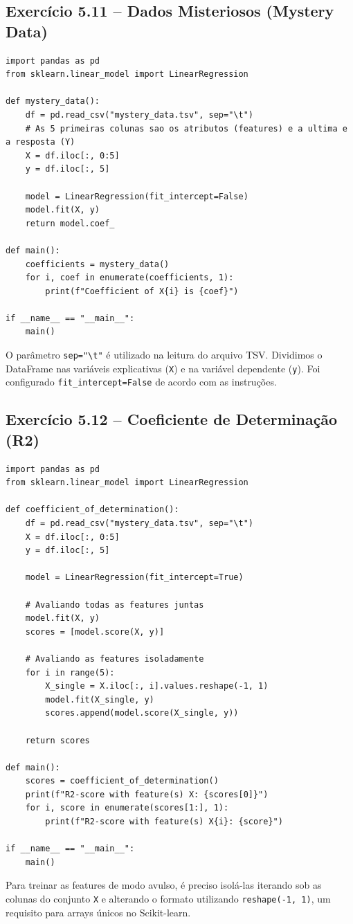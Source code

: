 \documentclass[11pt,a4paper]{article}
\begin{document}
\subsection*{Exercício 5.11 -- Dados Misteriosos (Mystery Data)}
\begin{solucao}
\begin{lstlisting}
import pandas as pd
from sklearn.linear_model import LinearRegression

def mystery_data():
    df = pd.read_csv("mystery_data.tsv", sep="\t")
    # As 5 primeiras colunas sao os atributos (features) e a ultima e a resposta (Y)
    X = df.iloc[:, 0:5]
    y = df.iloc[:, 5]
    
    model = LinearRegression(fit_intercept=False)
    model.fit(X, y)
    return model.coef_

def main():
    coefficients = mystery_data()
    for i, coef in enumerate(coefficients, 1):
        print(f"Coefficient of X{i} is {coef}")

if __name__ == "__main__":
    main()
\end{lstlisting}
O parâmetro \texttt{sep="\textbackslash t"} é utilizado na leitura do arquivo TSV. Dividimos o DataFrame nas variáveis explicativas (\texttt{X}) e na variável dependente (\texttt{y}). Foi configurado \texttt{fit\_intercept=False} de acordo com as instruções.
\end{solucao}

\subsection*{Exercício 5.12 -- Coeficiente de Determinação (R2)}
\begin{solucao}
\begin{lstlisting}
import pandas as pd
from sklearn.linear_model import LinearRegression

def coefficient_of_determination():
    df = pd.read_csv("mystery_data.tsv", sep="\t")
    X = df.iloc[:, 0:5]
    y = df.iloc[:, 5]
    
    model = LinearRegression(fit_intercept=True)
    
    # Avaliando todas as features juntas
    model.fit(X, y)
    scores = [model.score(X, y)]
    
    # Avaliando as features isoladamente
    for i in range(5):
        X_single = X.iloc[:, i].values.reshape(-1, 1)
        model.fit(X_single, y)
        scores.append(model.score(X_single, y))
        
    return scores

def main():
    scores = coefficient_of_determination()
    print(f"R2-score with feature(s) X: {scores[0]}")
    for i, score in enumerate(scores[1:], 1):
        print(f"R2-score with feature(s) X{i}: {score}")

if __name__ == "__main__":
    main()
\end{lstlisting}
Para treinar as features de modo avulso, é preciso isolá-las iterando sob as colunas do conjunto \texttt{X} e alterando o formato utilizando \texttt{reshape(-1, 1)}, um requisito para arrays únicos no Scikit-learn.
\end{solucao}
\end{document}
